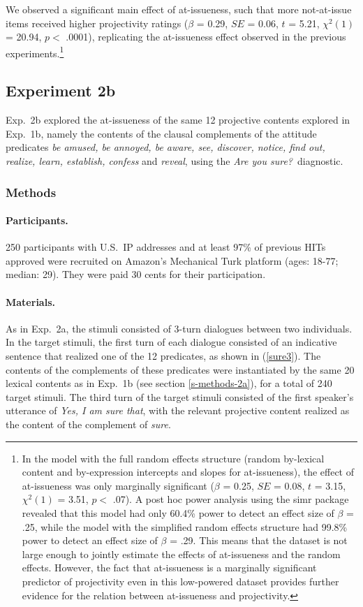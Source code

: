 \documentclass[11pt,fleqn]{article}
\newcommand{\6}{\mbox{$[\hspace*{-.6mm}[$}}
\newcommand{\9}{\mbox{$]\hspace*{-.6mm}]$}}
\begin{document}
We observed a significant main effect of at-issueness, such that more not-at-issue items  received higher projectivity ratings ($\beta$ = 0.29, $SE$ = 0.06, $t$ = 5.21, $\chi^2(1)$ = 20.94, $p <$ .0001), replicating the at-issueness effect observed in the previous experiments.\footnote{In the model with the full random effects structure (random by-lexical content and by-expression intercepts and slopes for at-issueness), the effect of at-issueness was only marginally significant ($\beta$ = 0.25, $SE$ = 0.08, $t$ = 3.15, $\chi^2(1)$ = 3.51, $p <$ .07).  A post hoc power analysis using the simr package \citep{simr} revealed that this model had only 60.4\% power to detect an effect size of $\beta$ = .25, while the model with the simplified random effects structure had 99.8\% power to detect an effect size of $\beta$ = .29. This means that the dataset is not large enough to jointly estimate the effects of at-issueness and the random effects. However, the fact that at-issueness is a marginally significant predictor of projectivity even in this low-powered dataset provides further evidence for the relation between at-issueness and projectivity.}

\subsection{Experiment 2b}\label{s-exp2b}

Exp.~2b explored the at-issueness of the same 12 projective contents explored in Exp.~1b, namely the contents of the clausal complements of the attitude predicates {\em be amused, be annoyed, be aware, see, discover, notice, find out, realize, learn, establish, confess} and {\em reveal}, using the {\em Are you sure?}~diagnostic.

\subsubsection{Methods}

\paragraph{Participants.} 250 participants with U.S.\ IP addresses and at least 97\% of previous HITs approved were recruited on Amazon's Mechanical Turk platform (ages: 18-77; median: 29). They were paid 30 cents for their participation.

\paragraph{Materials.} As in Exp.~2a, the stimuli consisted of 3-turn dialogues between two individuals. In the target stimuli, the first turn of each dialogue consisted of an indicative sentence that realized one of the 12 predicates, as shown in (\ref{sure3}). The contents of the complements of these predicates were instantiated by the same 20 lexical contents as in Exp.~1b (see section \ref{s-methods-2a}), for a total of 240 target stimuli. The third turn of the target stimuli consisted of the first speaker's utterance of {\em Yes, I am sure that}, with the relevant projective content realized as the content of the complement of {\em sure}. 
\end{document}
